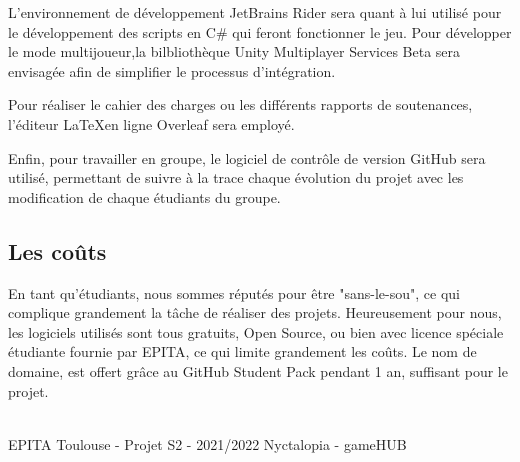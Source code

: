 L’environnement de développement JetBrains Rider sera quant à lui utilisé pour le développement des scripts en C\# qui feront fonctionner le jeu. Pour développer le mode multijoueur,la bilbliothèque Unity Multiplayer Services Beta sera envisagée afin de simplifier le processus d'intégration.


Pour réaliser le cahier des charges ou les différents rapports de soutenances, l'éditeur \LaTeX  en ligne Overleaf sera employé.


Enfin, pour travailler en groupe, le logiciel de contrôle de version GitHub sera utilisé, permettant de suivre à la trace chaque évolution du projet avec les modification de chaque étudiants du groupe.

\subsection{Les coûts}
En tant qu'étudiants, nous sommes réputés pour être "sans-le-sou", ce qui complique grandement la tâche de réaliser des projets. Heureusement pour nous, les logiciels utilisés sont tous gratuits, Open Source, ou bien avec licence spéciale étudiante fournie par EPITA, ce qui limite grandement les coûts.
Le nom de domaine, est offert grâce au GitHub Student Pack pendant 1 an, suffisant pour le projet.

\vfill
\noindent\makebox[\linewidth]{\rule{.8\paperwidth}{.6pt}}\\[0.2cm]
EPITA Toulouse - Projet S2 - 2021/2022 \hfill Nyctalopia - gameHUB
\noindent\makebox[\linewidth]{\rule{.8\paperwidth}{.6pt}}

\newpage